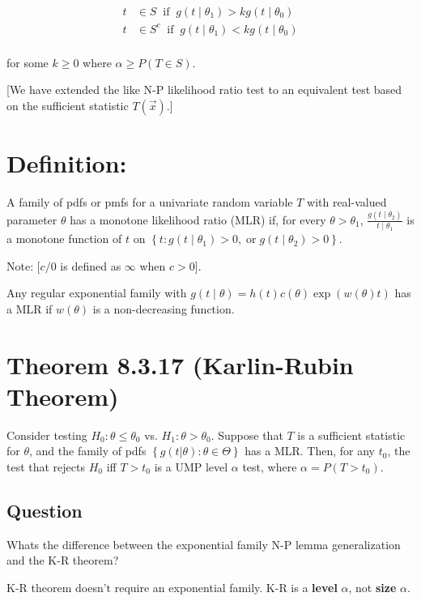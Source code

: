 \documentclass[a4paper]{article}
\begin{document}
\begin{align*}
	t &\in S \;\; \text{if}\;\; g(t \mid \theta_1) > k g(t \mid \theta_0) \\
	t &\in S^c \;\; \text{if}\;\; g(t \mid \theta_1) < k g(t \mid \theta_0) \\
\end{align*}

for some $k \geq 0$ where $\alpha \geq P(T \in S)$. 

[We have extended the like N-P likelihood ratio test to an equivalent test based on the sufficient statistic $T(\vec{x})$.]

\section*{Definition:}

A family of pdfs or pmfs for a univariate random variable $T$ with real-valued parameter $\theta$ has a monotone likelihood ratio (MLR) if, for every $\theta > \theta_1$, $\frac{g(t \mid \theta_2)}{t \mid \theta_1}$ is a monotone function of $t$ on $\left\{ t: g(t \mid \theta_1) > 0, \; \text{or}\; g(t \mid \theta_2) > 0 \right\}$. 

Note: [$c/0$ is defined as $\infty$ when $c>0$]. 

Any regular exponential family with $g(t\mid \theta) = h(t)c(\theta)\exp(w(\theta)t)$ has a MLR if $w(\theta)$ is a non-decreasing function.

\section{Theorem 8.3.17 (Karlin-Rubin Theorem)}

Consider testing $H_0: \theta \leq \theta_0$ vs. $H_1: \theta > \theta_0$. Suppose that $T$ is a sufficient statistic for $\theta$, and the family of pdfs $\left\{ g(t | \theta): \theta \in \Theta \right\}$ has a MLR. Then, for any $t_0$, the test that rejects $H_0$ iff $T > t_0$ is a UMP level $\alpha$ test, where $\alpha = P(T > t_0)$.

\subsection*{Question}

Whats the difference between the exponential family N-P lemma generalization and the K-R theorem?

K-R theorem doesn't require an exponential family. K-R is a \textbf{level} $\alpha$, not \textbf{size} $\alpha$. 
\end{document}
